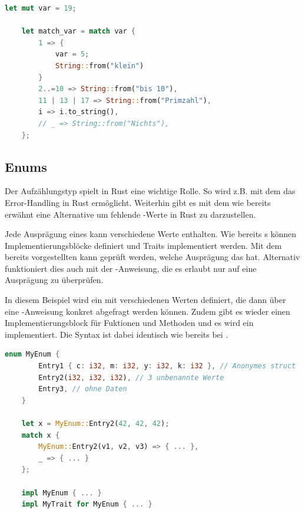 \documentclass[11pt,a4paper, ngerman]{article}
\begin{document}
\newpage

\begin{lstlisting}[language=rust, caption={match}]
    let mut var = 19;

    let match_var = match var {
        1 => {
            var = 5;
            String::from("klein")
        }
        2..=10 => String::from("bis 10"),
        11 | 13 | 17 => String::from("Primzahl"),
        i => i.to_string(),
        // _ => String::from("Nichts"),
    };
\end{lstlisting}

\subsection{Enums}
Der Aufzählungstyp  spielt in Rust eine wichtige Rolle. So wird z.B. mit dem   das Error-Handling in Rust ermöglicht. Weiterhin gibt es mit dem   wie bereits erwähnt eine Alternative um fehlende -Werte in Rust zu darzustellen.

Jede Ausprägung eines  kann verschiedene Werte enthalten. Wie bereits s können Implementierungsblöcke definiert und Traits implementiert werden. Mit dem bereits vorgestellten  kann geprüft werden, welche Ausprägung das  hat. Alternativ funktioniert dies auch mit der -Anweisung, die es erlaubt nur auf eine Ausprägung zu überprüfen.

In diesem Beispiel wird ein  mit verschiedenen Werten definiert, die dann über eine -Anweisung konkret abgefragt werden können. Zudem gibt es wieder einen Implementierungsblock für Fuktionen und Methoden und es wird ein  implementiert. Die Syntax ist dabei identisch wie bereits bei .

\begin{lstlisting}[language=rust, caption={enum}]
    enum MyEnum {
        Entry1 { c: i32, m: i32, y: i32, k: i32 }, // Anonymes struct
        Entry2(i32, i32, i32), // 3 unbenannte Werte
        Entry3, // ohne Daten
    }

    let x = MyEnum::Entry2(42, 42, 42);
    match x {
        MyEnum::Entry2(v1, v2, v3) => { ... },
        _ => { ... }
    };

    impl MyEnum { ... }
    impl MyTrait for MyEnum { ... }
\end{lstlisting}
\end{document}

